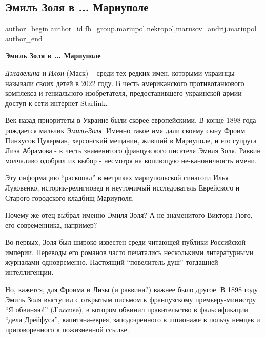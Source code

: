  
 
 
 
 

\subsection{Эмиль Золя в ... Мариуполе}
\label{sec:26_01_2023.fb.fb_group.mariupol.nekropol.1.emil_zolja_v_mariupole}
 
\ifcmt
 author_begin
   author_id fb_group.mariupol.nekropol,marusov_andrij.mariupol
 author_end
\fi

\textbf{Эмиль Золя в ... Мариуполе}

\emph{Джавелина} и \emph{Илон} (Маск) – среди тех редких имен, которыми украинцы называли
своих детей в 2022 году. В честь американского противотанкового комплекса и
гениального изобретателя, предоставившего украинской армии доступ к сети
интернет Starlink.

Век назад приоритеты в Украине были скорее европейскими. В конце 1898 года
рождается мальчик \emph{Эмиль-Золя}. Именно такое имя дали своему сыну Фроим Пинхусов
Цукерман, херсонский мещанин, живший в Мариуполе, и его супруга Лиза Абрамова -
в честь знаменитого французского писателя Эмиля Золя. Раввин молчаливо одобрил
их выбор - несмотря на вопиющую не-каноничность имени.

Эту информацию \enquote{раскопал} в метриках мариупольской синагоги Илья Луковенко,
историк-религиовед и неутомимый исследователь Еврейского и Старого городского
кладбищ Мариуполя.

Почему же отец выбрал именно Эмиля Золя? А не знаменитого Виктора Гюго, его современника, например?

Во-первых, Золя был широко известен среди читающей публики Российской империи.
Переводы его романов часто печатались несколькими литературными журналами
одновременно. Настоящий \enquote{повелитель душ} тогдашней интеллигенции.

Но, кажется, для Фроима и Лизы (и раввина?) важнее было другое. В 1898 году
Эмиль Золя выступил с открытым письмом к французскому премьеру-министру
\enquote{Я обвиняю!} (J'accuse), в котором обвинил правительство в
фальсификации \enquote{дела Дрейфуса}, капитана-еврея, заподозренного в
шпионаже в пользу немцев и приговоренного к пожизненной ссылке.

